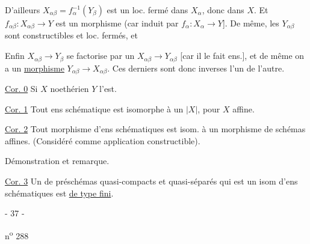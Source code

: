 
D'ailleurs $X_{\alpha\beta}=f_\alpha^{-1}(Y_\beta)$ est un  loc. fermé dans $X_\alpha$, donc dans $X$. Et $f_{\alpha\beta}:X_{\alpha\beta}\longrightarrow Y$ est un morphisme  (car induit par $f_\alpha:X_\alpha\longrightarrow Y$].  De même, les $Y_{\alpha\beta}$ sont constructibles et loc. fermés, et 

Enfin  $X_{\alpha\beta}\longrightarrow Y_\beta$ se factorise par un  $X_{\alpha\beta}\longrightarrow Y_{\alpha\beta}$ [car il le fait ens.], et de même on a un \uline{morphisme} $Y_{\alpha\beta}\longrightarrow X_{\alpha\beta}$. Ces derniers sont donc inverses l'un de l'autre.

\uline{Cor. 0} Si $X$ noethérien $Y$ l'est.

\uline{Cor. 1} Tout ens schématique est isomorphe à un $|X|$, pour $X$ affine.

\uline{Cor. 2} Tout morphisme d'ens schématiques est isom. à un morphisme de  schémas affines. (Considéré comme application constructible).

Démonstration et remarque.


\uline{Cor. 3} Un   de préschémas quasi-compacts et quasi-séparés qui est un isom d'ens schématiques est \uline{de type fini}.

\begin{center}- 37 -\end{center}
\hfill n\textsuperscript{o} 288

